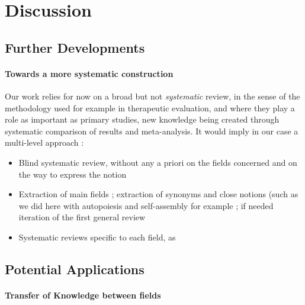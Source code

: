 \documentclass[fleqn,10pt]{wlscirep}
\begin{document}
\section*{Discussion}

\subsection*{Further Developments}

\paragraph{Towards a more systematic construction}


Our work relies for now on a broad but not \emph{systematic} review, in the sense of the methodology used for example in therapeutic evaluation, and where they play a role as important as primary studies, new knowledge being created through systematic comparison of results and meta-analysis. It would imply in our case a multi-level approach :
\begin{itemize}
\item Blind systematic review, without any a priori on the fields concerned and on the way to express the notion
\item Extraction of main fields ; extraction of synonyms and close notions (such as we did here with autopoiesis and self-assembly for example ; if needed iteration of the first general review
\item Systematic reviews specific to each field, as 
\end{itemize}





\subsection*{Potential Applications}


\paragraph{Transfer of Knowledge between fields}
\end{document}
